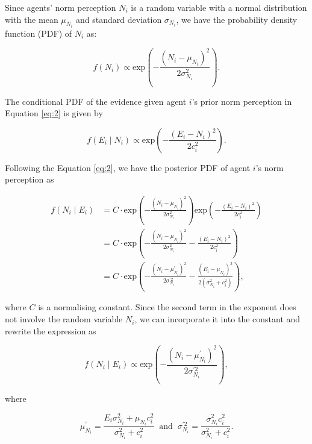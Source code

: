 \documentclass[
  11pt,
]{article}
\begin{document}
Since agents' norm perception \(N_i\) is a random variable with a normal
distribution with the mean \(\mu_{N_i}\) and standard deviation
\(\sigma_{N_i}\), we have the probability density function (PDF) of
\(N_i\) as:

\begin{equation*}
f(N_i) \propto \text{exp}(-\frac{(N_i - \mu_{N_i})^2}{2\sigma_{N_i}^2}).
\end{equation*}

The conditional PDF of the evidence given agent \(i\)'s prior norm
perception in Equation \ref{eq:2} is given by

\begin{equation*}
f(E_i \mid N_i) \propto \text{exp}(-\frac{(E_i - N_i)^2}{2c_i^2}).
\end{equation*}

Following the Equation \ref{eq:2}, we have the posterior PDF of agent
\(i\)'s norm perception as

\begin{equation*}
  \begin{aligned}
    f(N_i \mid E_i) &= C \cdot \text{exp}(-\frac{(N_i - \mu_{N_i})^2}{2\sigma_{N_i}^2}) \text{exp}(- \frac{(E_i - N_i)^2}{2c_i^2})\\
      &= C \cdot \text{exp}(-\frac{(N_i - \mu_{N_i})^2}{2\sigma_{N_i}^2} - \frac{(E_i - N_i)^2}{2c_i^2})\\
      &= C \cdot \text{exp}(- \frac{(N_i - \mu_{N_i}^{\prime})^2}{2\sigma_{N_i}^{\prime2}} - \frac{(E_i - \mu_{N_i})^2}{2(\sigma_{N_i}^2 + c_i^2)}),
  \end{aligned}
\end{equation*}

where \(C\) is a normalising constant. Since the second term in the
exponent does not involve the random variable \(N_i\), we can
incorporate it into the constant and rewrite the expression as

\begin{equation*}
  f(N_i \mid E_i) \propto \text{exp}(- \frac{(N_i - \mu_{N_i}^{\prime})^2}{2\sigma_{N_i}^{\prime2}}),
\end{equation*}

where

\begin{equation*}
  \mu_{N_i}^{\prime} = \frac{E_i \sigma_{N_i}^2 + \mu_{N_i} c_i^2}{\sigma_{N_i}^2 + c_i^2} \;\; \text{and} \;\; \sigma_{N_i}^{\prime2} = \frac{\sigma_{N_i}^2 c_i^2}{\sigma_{N_i}^2 + c_i^2}.
\end{equation*}
\end{document}
